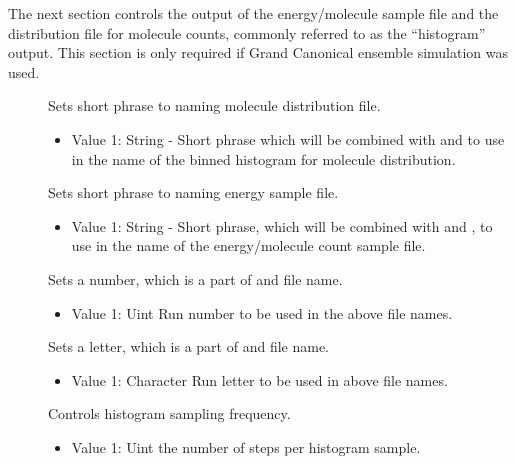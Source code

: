 \documentclass[letterpaper,10pt,english]{sphinxmanual}
\begin{document}
The next section controls the output of the energy/molecule sample file and the distribution file for molecule counts, commonly referred to as the “histogram” output. This section is only required if Grand Canonical ensemble simulation was used.
\begin{description}
\item[{}] \leavevmode
Sets short phrase to naming molecule distribution file.
\begin{itemize}
\item {} 
Value 1: String - Short phrase which will be combined with  and  to use in the name of the binned histogram for molecule distribution.

\end{itemize}

\item[{}] \leavevmode
Sets short phrase to naming energy sample file.
\begin{itemize}
\item {} 
Value 1: String - Short phrase, which will be combined with  and , to use in the name of the energy/molecule count sample file.

\end{itemize}

\item[{}] \leavevmode
Sets a number, which is a part of  and  file name.
\begin{itemize}
\item {} 
Value 1: Uint \textendash{} Run number to be used in the above file names.

\end{itemize}

\item[{}] \leavevmode
Sets a letter, which is a part of  and  file name.
\begin{itemize}
\item {} 
Value 1: Character \textendash{} Run letter to be used in above file names.

\end{itemize}

\item[{}] \leavevmode
Controls histogram sampling frequency.
\begin{itemize}
\item {} 
Value 1: Uint \textendash{} the number of steps per histogram sample.


\end{itemize}
\end{description}
\end{document}

